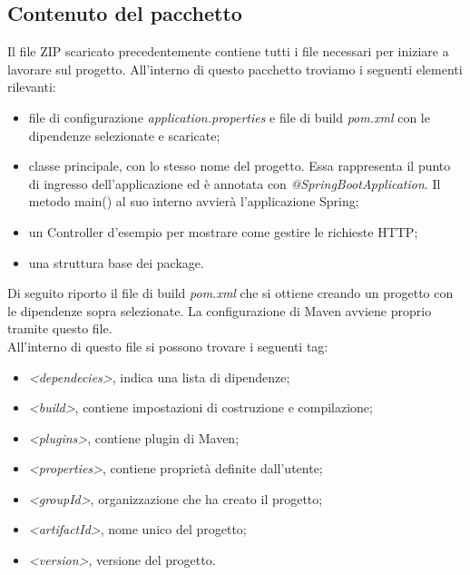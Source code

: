 \subsection{Contenuto del pacchetto}
Il file ZIP scaricato precedentemente contiene tutti i file necessari per iniziare a lavorare sul progetto. All'interno di questo pacchetto troviamo i seguenti elementi rilevanti:
\begin{itemize}
\item file di configurazione \textit{application.properties} e file di build \textit{pom.xml} con le dipendenze selezionate e scaricate;
\item classe principale, con lo stesso nome del progetto. Essa rappresenta il punto di ingresso dell'applicazione ed è annotata con \textit{@SpringBootApplication}. Il metodo main() al suo interno avvierà l'applicazione Spring;
\item un Controller d'esempio per mostrare come gestire le richieste HTTP;
\item una struttura base dei package.
\end{itemize}
Di seguito riporto il file di build \textit{pom.xml} che si ottiene creando un progetto con le dipendenze sopra selezionate. La configurazione di Maven avviene proprio tramite questo file.\\
All'interno di questo file si possono trovare i seguenti tag:
\begin{itemize}
\item \textit{<dependecies>}, indica una lista di dipendenze;
\item \textit{<build>}, contiene impostazioni di costruzione e compilazione;
\item \textit{<plugins>}, contiene plugin di Maven;
\item \textit{<properties>}, contiene proprietà definite dall'utente;
\item \textit{<groupId>}, organizzazione che ha creato il progetto;
\item \textit{<artifactId>}, nome unico del progetto;
\item \textit{<version>},  versione del progetto.
\end{itemize}

